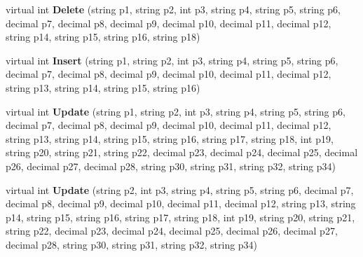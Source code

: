 \begin{DoxyCompactItemize}
\item 
virtual int {\bfseries Delete} (string p1, string p2, int p3, string p4, string p5, string p6, decimal p7, decimal p8, decimal p9, decimal p10, decimal p11, decimal p12, string p14, string p15, string p16, string p18)\hypertarget{class_products_1_1_data_1_1ds_sage_table_adapters_1_1ta_offer_detail_adfc640cded6d4f8c76f9c9db4ae190d4}{}\label{class_products_1_1_data_1_1ds_sage_table_adapters_1_1ta_offer_detail_adfc640cded6d4f8c76f9c9db4ae190d4}

\item 
virtual int {\bfseries Insert} (string p1, string p2, int p3, string p4, string p5, string p6, decimal p7, decimal p8, decimal p9, decimal p10, decimal p11, decimal p12, string p13, string p14, string p15, string p16)\hypertarget{class_products_1_1_data_1_1ds_sage_table_adapters_1_1ta_offer_detail_a2d8fcc04e1da2f2f52d21ce221327604}{}\label{class_products_1_1_data_1_1ds_sage_table_adapters_1_1ta_offer_detail_a2d8fcc04e1da2f2f52d21ce221327604}

\item 
virtual int {\bfseries Update} (string p1, string p2, int p3, string p4, string p5, string p6, decimal p7, decimal p8, decimal p9, decimal p10, decimal p11, decimal p12, string p13, string p14, string p15, string p16, string p17, string p18, int p19, string p20, string p21, string p22, decimal p23, decimal p24, decimal p25, decimal p26, decimal p27, decimal p28, string p30, string p31, string p32, string p34)\hypertarget{class_products_1_1_data_1_1ds_sage_table_adapters_1_1ta_offer_detail_a3cb47ab61cc4628b8f1fcd33637d2e39}{}\label{class_products_1_1_data_1_1ds_sage_table_adapters_1_1ta_offer_detail_a3cb47ab61cc4628b8f1fcd33637d2e39}

\item 
virtual int {\bfseries Update} (string p2, int p3, string p4, string p5, string p6, decimal p7, decimal p8, decimal p9, decimal p10, decimal p11, decimal p12, string p13, string p14, string p15, string p16, string p17, string p18, int p19, string p20, string p21, string p22, decimal p23, decimal p24, decimal p25, decimal p26, decimal p27, decimal p28, string p30, string p31, string p32, string p34)\hypertarget{class_products_1_1_data_1_1ds_sage_table_adapters_1_1ta_offer_detail_a91838d379fe79e41a0043fb91f2109c0}{}\label{class_products_1_1_data_1_1ds_sage_table_adapters_1_1ta_offer_detail_a91838d379fe79e41a0043fb91f2109c0}

\end{DoxyCompactItemize}
